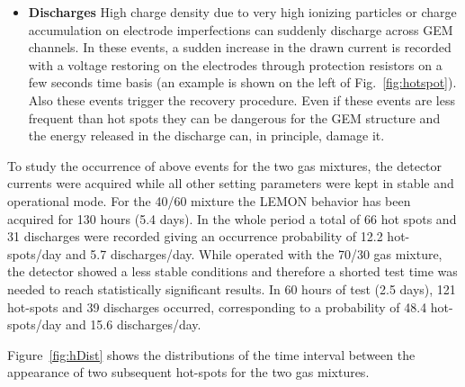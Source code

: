 \documentclass[a4paper,11pt]{article}
\begin{document}
\begin{itemize}
\item{\bf Discharges} High charge density due to very high ionizing particles or charge accumulation on electrode imperfections can suddenly discharge across GEM channels. In these events, a sudden increase in the drawn current is recorded with a voltage restoring on the electrodes through protection resistors on a few seconds time basis (an example is shown on the left of Fig.~\ref{fig:hotspot}). Also these events trigger the recovery procedure.
Even if these events are less frequent than hot spots 
they can be dangerous for the GEM structure and the energy released in the discharge can, in principle, damage it.

\end{itemize}



To study the occurrence of above events for the two gas mixtures, the detector currents were acquired while all other setting parameters were kept in stable and operational mode. 
For the 40/60 mixture the LEMON behavior has been acquired for 130 hours (5.4 days). In the whole period a total of 66 hot spots and 31 discharges were recorded giving an occurrence probability of 12.2 hot-spots/day and 5.7 discharges/day.
While operated with the 70/30 gas mixture, the detector showed a less stable conditions and therefore a shorted test time was needed to reach statistically significant results. In 60 hours of test (2.5 days), 121 hot-spots and 39 discharges occurred, corresponding to a probability of 48.4 hot-spots/day and 15.6 discharges/day.

Figure~\ref{fig:hDist} shows the distributions of the time interval between the appearance of two subsequent hot-spots for the two gas mixtures.
\end{document}
